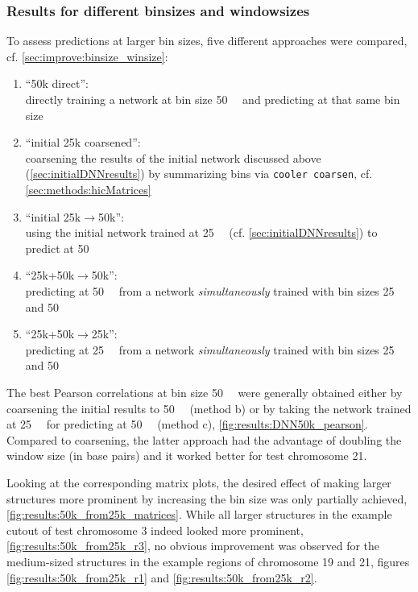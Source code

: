 \subsubsection{Results for different binsizes and windowsizes} \label{sec:results:binsize_winsize}
To assess predictions at larger bin sizes, five different approaches were compared, cf. \cref{sec:improve:binsize_winsize}:
\begin{enumerate}
 \item ``50k direct'': \\directly training a network at bin size \SI{50}{\kilo\bp} and predicting at that same bin size
 \item ``initial 25k coarsened'': \\coarsening the results of the initial network discussed above (\cref{sec:initialDNNresults})
                    by summarizing bins via \texttt{cooler coarsen}, cf. \cref{sec:methods:hicMatrices}
 \item ``initial 25k$\rightarrow$50k'': \\using the initial network trained at \SI{25}{\kilo\bp} (cf. \cref{sec:initialDNNresults}) to predict at \SI{50}{\kilo\bp}
 \item ``25k+50k$\rightarrow$50k'': \\predicting at \SI{50}{\kilo\bp} from a network \emph{simultaneously} trained with bin sizes 25 and \SI{50}{\kilo\bp}
 \item ``25k+50k$\rightarrow$25k'': \\predicting at \SI{25}{\kilo\bp} from a network \emph{simultaneously} trained with bin sizes 25 and \SI{50}{\kilo\bp}
\end{enumerate}

The best Pearson correlations at bin size \SI{50}{\kilo\bp} were generally obtained either by coarsening the initial results to \SI{50}{\kilo\bp} 
(method b) or by taking the network trained at \SI{25}{\kilo\bp} for predicting at \SI{50}{\kilo\bp} (method c), \cref{fig:results:DNN50k_pearson}.
Compared to coarsening, the latter approach had the advantage of doubling the window size (in base pairs) and it worked better for test chromosome 21.

Looking at the corresponding matrix plots, the desired effect of making larger structures more prominent by increasing the bin size was only partially achieved, \cref{fig:results:50k_from25k_matrices}.
While all larger structures in the example cutout of test chromosome 3 indeed looked more prominent, \cref{fig:results:50k_from25k_r3},
no obvious improvement was observed for the medium-sized structures in the example regions of chromosome 19 and 21, 
figures \ref{fig:results:50k_from25k_r1} and \ref{fig:results:50k_from25k_r2}.

